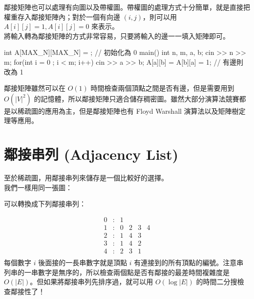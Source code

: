 \documentclass[main.tex]{subfiles}
\begin{document}
鄰接矩陣也可以處理有向圖以及帶權圖。帶權圖的處理方式十分簡單，就是直接把權重存入鄰接矩陣內；對於一個有向邊 $(i, j)$，則可以用 $A[i][j] = 1, A[i][j] = 0$ 來表示。\\

將輸入轉為鄰接矩陣的方式非常容易，只要將輸入的邊一一填入矩陣即可。
\begin{C++}
int A[MAX_N][MAX_N] = {}; // 初始化為 0
main(){
    int n, m, a, b;
    cin >> n >> m;
    for(int i = 0 ; i < m; i++){
        cin >> a >> b;
        A[a][b] = A[b][a] = 1; // 有邊則改為 1
    }
}
\end{C++}

鄰接矩陣雖然可以在 $O(1)$ 時間檢查兩個頂點之間是否有邊，但是需要用到 $O(|V|^2)$ 的記憶體，所以鄰接矩陣只適合儲存稠密圖。雖然大部分演算法競賽都是以稀疏圖的應用為主，但是鄰接矩陣也有 Floyd Warshall 演算法以及矩陣樹定理等應用。

\section{鄰接串列 (Adjacency List)}
至於稀疏圖，用鄰接串列來儲存是一個比較好的選擇。\\

我們一樣用同一張圖：
\begin{center}
\end{center}

可以轉換成下列鄰接串列：

\begin{displaymath}
\begin{matrix}
0 & : & 1\\
1 & : & 0 & 2 & 3 & 4\\
2 & : & 1 & 4 & 3\\
3 & : & 1 & 4 & 2\\
4 & : & 2 & 3 & 1\\
\end{matrix}
\end{displaymath}
每個數字 $i$ 後面接的一長串數字就是頂點 $i$ 有連接到的所有頂點的編號。注意串列串的一串數字是無序的，所以檢查兩個點是否有鄰接的最差時間複雜度是 $O(|E|)$。但如果將鄰接串列先排序過，就可以用 $O(\log |E|)$ 的時間二分搜檢查鄰接性了！\\
\end{document}
